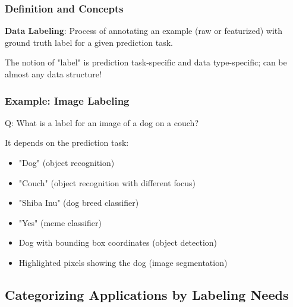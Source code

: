 \documentclass[12pt]{article}
\begin{document}
\subsubsection{Definition and Concepts}
\begin{tcolorbox}[colback=yellow!5!white,colframe=yellow!75!black,title={Definition}]
\textbf{Data Labeling}: Process of annotating an example (raw or featurized) with ground truth label for a given prediction task.

The notion of "label" is prediction task-specific and data type-specific; can be almost any data structure!
\end{tcolorbox}

\subsubsection{Example: Image Labeling}
\begin{tcolorbox}[colback=blue!5!white,colframe=blue!75!black,title={Example: Multiple Labels for the Same Image}]
Q: What is a label for an image of a dog on a couch?

It depends on the prediction task:
\begin{itemize}
    \item "Dog" (object recognition)
    \item "Couch" (object recognition with different focus)
    \item "Shiba Inu" (dog breed classifier)
    \item "Yes" (meme classifier)
    \item Dog with bounding box coordinates (object detection)
    \item Highlighted pixels showing the dog (image segmentation)
\end{itemize}
\end{tcolorbox}

\subsection{Categorizing Applications by Labeling Needs}
\end{document}
